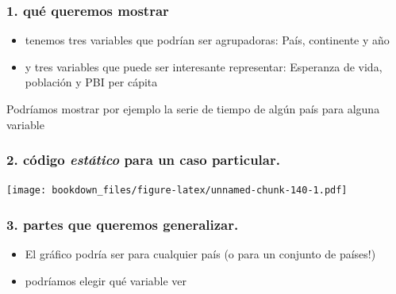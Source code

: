\documentclass[]{book}
\newenvironment{Shaded}{\begin{snugshade}}{\end{snugshade}}
\newcommand{\KeywordTok}[1]{\textcolor[rgb]{0.13,0.29,0.53}{\textbf{#1}}}
\newcommand{\NormalTok}[1]{#1}
\newcommand{\OperatorTok}[1]{\textcolor[rgb]{0.81,0.36,0.00}{\textbf{#1}}}
\newcommand{\StringTok}[1]{\textcolor[rgb]{0.31,0.60,0.02}{#1}}
\providecommand{\tightlist}{%
  \setlength{\itemsep}{0pt}\setlength{\parskip}{0pt}}
\begin{document}
\hypertarget{que-queremos-mostrar}{%
\subsubsection{1. qué queremos mostrar}\label{que-queremos-mostrar}}

\begin{itemize}
\tightlist
\item
  tenemos tres variables que podrían ser agrupadoras: País, continente y año
\item
  y tres variables que puede ser interesante representar: Esperanza de vida, población y PBI per cápita
\end{itemize}

Podríamos mostrar por ejemplo la serie de tiempo de algún país para alguna variable

\hypertarget{codigo-estatico-para-un-caso-particular.}{%
\subsubsection{\texorpdfstring{2. código \emph{estático} para un caso particular.}{2. código estático para un caso particular.}}\label{codigo-estatico-para-un-caso-particular.}}

\begin{Shaded}
\end{Shaded}

\texttt{[image: bookdown\_files/figure-latex/unnamed-chunk-140-1.pdf]}

\hypertarget{partes-que-queremos-generalizar.}{%
\subsubsection{3. partes que queremos generalizar.}\label{partes-que-queremos-generalizar.}}

\begin{itemize}
\tightlist
\item
  El gráfico podría ser para cualquier país (o para un conjunto de países!)
\item
  podríamos elegir qué variable ver
\end{itemize}
\end{document}
